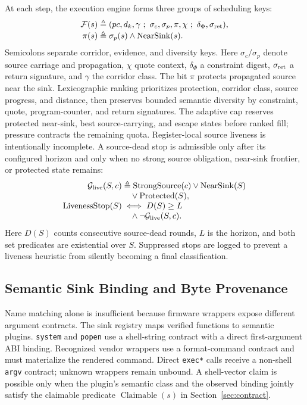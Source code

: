 At each step, the execution engine forms three groups of scheduling keys:
\begin{equation}
\begin{aligned}
\mathcal{F}(s)&\triangleq
(pc,d_k,\gamma\ ;\ \sigma_c,\sigma_p,\pi,\chi\ ;\ \delta_{\Phi},\sigma_{\rm ret}),\\[-1mm]
\pi(s)&\triangleq \sigma_p(s)\land\operatorname{NearSink}(s).
\end{aligned}
\label{eq:state-projection}
\end{equation}
Semicolons separate corridor, evidence, and diversity keys. Here
$\sigma_c/\sigma_p$ denote source carriage and propagation, $\chi$ quote
context, $\delta_{\Phi}$ a constraint digest, $\sigma_{\rm ret}$ a return signature, and
$\gamma$ the corridor class. The bit $\pi$ protects propagated source near the
sink. Lexicographic ranking prioritizes protection, corridor class, source
progress, and distance, then preserves bounded semantic diversity by
constraint, quote, program-counter, and return signatures. The adaptive cap
reserves protected near-sink, best source-carrying, and escape states before
ranked fill; pressure contracts the remaining quota.
Register-local source liveness is intentionally incomplete. A source-dead stop
is admissible only after its configured horizon and only when no strong source
obligation, near-sink frontier, or protected state remains:
\begin{equation}
\begin{aligned}
\mathcal G_{\rm live}(S,c)&\triangleq\operatorname{StrongSource}(c)
 \lor\operatorname{NearSink}(S)\\[-1mm]
 &\quad\lor\operatorname{Protected}(S),\\[-1mm]
\operatorname{LivenessStop}(S)&\iff D(S)\geq L\\[-1mm]
 &\quad\land\neg\mathcal G_{\rm live}(S,c).
\end{aligned}
\label{eq:liveness-stop}
\end{equation}
Here $D(S)$ counts consecutive source-dead rounds, $L$ is the horizon, and both
set predicates are existential over $S$. Suppressed stops are logged to prevent
a liveness heuristic from silently becoming a final classification.

\subsection{Semantic Sink Binding and Byte Provenance}
\label{sec:sink-semantics}

Name matching alone is insufficient because firmware wrappers expose different
argument contracts. The sink registry maps verified functions to semantic
plugins. \texttt{system} and \texttt{popen} use a shell-string contract with a
direct first-argument ABI binding. Recognized vendor wrappers use a
format-command contract and must materialize the rendered command. Direct
\texttt{exec*} calls receive a non-shell \texttt{argv} contract; unknown
wrappers remain unbound. A shell-vector claim is possible only when the plugin's
semantic class and the observed binding jointly satisfy the claimable predicate
$\operatorname{Claimable}(s)$ in Section~\ref{sec:contract}.

